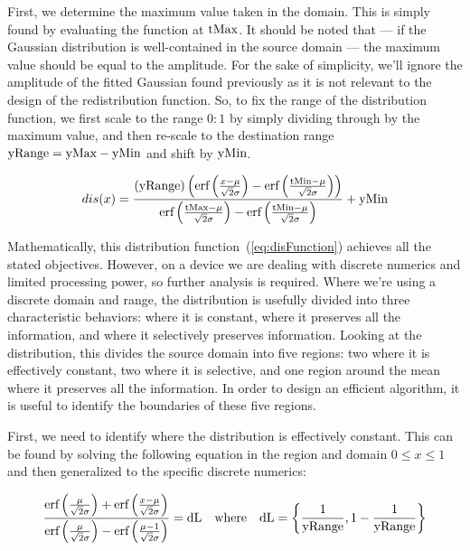 First, we determine the maximum value taken in the domain. This is simply found by evaluating the function at $\text{tMax}$. It should be noted that --- if the Gaussian distribution is well-contained in the source domain --- the maximum value should be equal to the amplitude. For the sake of simplicity, we'll ignore the amplitude of the fitted Gaussian found previously as it is not relevant to the design of the redistribution function. So, to fix the range of the distribution function, we first scale to the range $0:1$ by simply dividing through by the maximum value, and then re-scale to the destination range $\text{yRange} = \text{yMax} - \text{yMin}$ and shift by $\text{yMin}$.

\begin{equation}\label{eq:disFunction}
  dis(x) = \frac{(\text{yRange}) \left(\text{erf}\left(\frac{x-\mu }{\sqrt{2} \sigma }\right)-\text{erf}\left(\frac{\text{tMin}-\mu }{\sqrt{2} \sigma }\right)\right)}{\text{erf}\left(\frac{\text{tMax}-\mu }{\sqrt{2} \sigma }\right)-\text{erf}\left(\frac{\text{tMin}-\mu }{\sqrt{2} \sigma }\right)}+\text{yMin}
\end{equation}

Mathematically, this distribution function~(\ref{eq:disFunction}) achieves all the stated objectives. However, on a device we are dealing with discrete numerics and limited processing power, so further analysis is required. Where we're using a discrete domain and range, the distribution is usefully divided into three characteristic behaviors:  where it is constant, where it preserves all the information, and where it selectively preserves information. Looking at the distribution, this divides the source domain into five regions: two where it is effectively constant, two where it is selective, and one region around the mean where it preserves all the information. In order to design an efficient algorithm, it is useful to identify the boundaries of these five regions.

First, we need to identify where the distribution is effectively constant. This can be found by solving the following equation in the region and domain $0 \le x \le 1$ and then generalized to the specific discrete numerics:

\begin{equation}\label{eq:0to1}
 \frac{\text{erf}\left(\frac{\mu }{\sqrt{2} \sigma }\right)+\text{erf}\left(\frac{x-\mu }{\sqrt{2} \sigma }\right)}{\text{erf}\left(\frac{\mu }{\sqrt{2} \sigma }\right)-\text{erf}\left(\frac{\mu -1}{\sqrt{2} \sigma }\right)}=\text{dL} \quad \text{where} \quad \text{dL} = \left\{ \frac{1}{\text{yRange}}, 1 - \frac{1}{\text{yRange}} \right\}
\end{equation}


